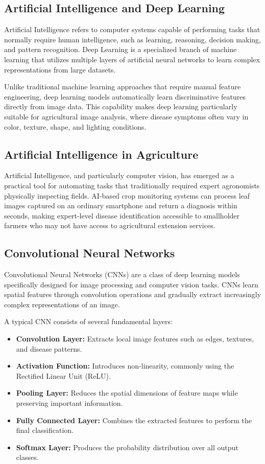 \subsection{Artificial Intelligence and Deep Learning}
Artificial Intelligence refers to computer systems capable of performing tasks that normally require human intelligence, such as learning, reasoning, decision making, and pattern recognition. Deep Learning is a specialized branch of machine learning that utilizes multiple layers of artificial neural networks to learn complex representations from large datasets.

Unlike traditional machine learning approaches that require manual feature engineering, deep learning models automatically learn discriminative features directly from image data. This capability makes deep learning particularly suitable for agricultural image analysis, where disease symptoms often vary in color, texture, shape, and lighting conditions.

\subsection{Artificial Intelligence in Agriculture}
Artificial Intelligence, and particularly computer vision, has emerged as a practical tool for automating tasks that traditionally required expert agronomists physically inspecting fields. AI-based crop monitoring systems can process leaf images captured on an ordinary smartphone and return a diagnosis within seconds, making expert-level disease identification accessible to smallholder farmers who may not have access to agricultural extension services.

\subsection{Convolutional Neural Networks}

Convolutional Neural Networks (CNNs) are a class of deep learning models specifically designed for image processing and computer vision tasks. CNNs learn spatial features through convolution operations and gradually extract increasingly complex representations of an image.

A typical CNN consists of several fundamental layers:

\begin{itemize}
    \item \textbf{Convolution Layer:} Extracts local image features such as edges, textures, and disease patterns.
    \item \textbf{Activation Function:} Introduces non-linearity, commonly using the Rectified Linear Unit (ReLU).
    \item \textbf{Pooling Layer:} Reduces the spatial dimensions of feature maps while preserving important information.
    \item \textbf{Fully Connected Layer:} Combines the extracted features to perform the final classification.
    \item \textbf{Softmax Layer:} Produces the probability distribution over all output classes.
\end{itemize}

